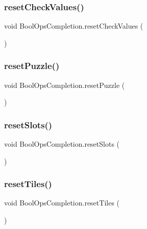 \subsubsection{\texorpdfstring{reset\+Check\+Values()}{resetCheckValues()}}
{\footnotesize\ttfamily void Bool\+Ops\+Completion.\+reset\+Check\+Values (\begin{DoxyParamCaption}{ }\end{DoxyParamCaption})}

\mbox{\label{class_bool_ops_completion_acf53c594f26e55aabd250724dc92ba53}} 
\subsubsection{\texorpdfstring{reset\+Puzzle()}{resetPuzzle()}}
{\footnotesize\ttfamily void Bool\+Ops\+Completion.\+reset\+Puzzle (\begin{DoxyParamCaption}{ }\end{DoxyParamCaption})}

\mbox{\label{class_bool_ops_completion_a6ce981e2a1853f4708ff01db8eabdcd9}} 
\subsubsection{\texorpdfstring{reset\+Slots()}{resetSlots()}}
{\footnotesize\ttfamily void Bool\+Ops\+Completion.\+reset\+Slots (\begin{DoxyParamCaption}{ }\end{DoxyParamCaption})}

\mbox{\label{class_bool_ops_completion_a665c424ab9487b5cf663921b38b86a1c}} 
\subsubsection{\texorpdfstring{reset\+Tiles()}{resetTiles()}}
{\footnotesize\ttfamily void Bool\+Ops\+Completion.\+reset\+Tiles (\begin{DoxyParamCaption}{ }\end{DoxyParamCaption})}




